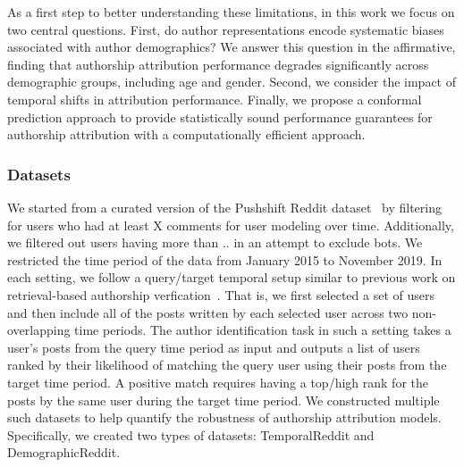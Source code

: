 As a first step to better understanding these limitations, in this work we focus on two central questions. First, do author representations encode systematic biases associated with author demographics? 
We answer this question in the affirmative, finding that authorship attribution performance degrades significantly across demographic groups, including age and gender. 
Second, we consider the impact of temporal shifts in attribution performance.
Finally, we propose a conformal prediction approach to provide statistically sound performance guarantees for authorship attribution with a computationally efficient approach.

\subsubsection{Datasets}
We started from a curated version of the Pushshift Reddit dataset~\cite{baumgartner2020pushshift} by filtering for users who had at least X comments for user modeling over time. 
Additionally, we filtered out users having more than .. in an attempt to exclude bots. 
We restricted the time period of the data from January 2015 to November 2019.
In each setting, we follow a query/target temporal setup similar to previous work on retrieval-based authorship verfication~\cite{andrews2019learning,khan2021deep}.
That is, we first selected a set of users and then include all of the posts written by each selected user across two non-overlapping time periods.
The author identification task in such a setting takes a user's posts from the query time period as input and outputs a list of users ranked by their likelihood of matching the query user using their posts from the target time period.
A positive match requires having a top/high rank for the posts by the same user during the target time period.
We constructed multiple such datasets to help quantify the robustness of authorship attribution models.
Specifically, we created two types of datasets: TemporalReddit and DemographicReddit.

